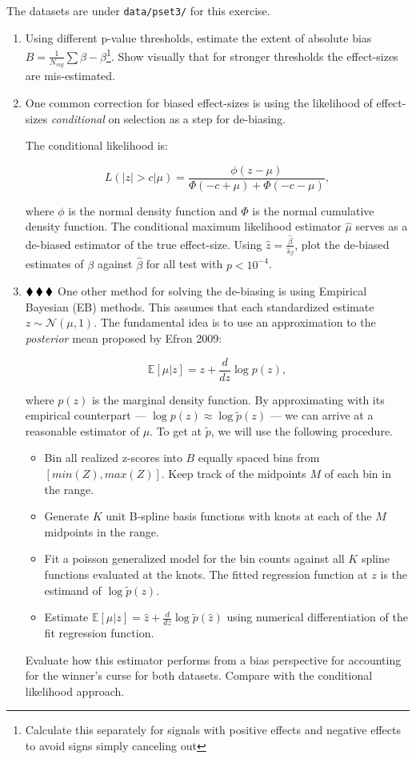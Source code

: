 \documentclass{pset}
\begin{document}
The datasets are under \texttt{data/pset3/} for this exercise.


\begin{enumerate}
\item Using different p-value thresholds, estimate the extent of absolute bias $B = \frac{1}{N_{sig}} \sum \hat{\beta} - \beta$\footnote{Calculate this separately for signals with positive effects and negative effects to avoid signs simply canceling out}. Show visually that for stronger thresholds the effect-sizes are mis-estimated. 
\item One common correction for biased effect-sizes is using the likelihood of effect-sizes \textit{conditional} on selection as a step for de-biasing.

The conditional likelihood is: 

$$L(|z| > c | \mu) = \frac{\phi(z - \mu)}{\Phi(-c + \mu) + \Phi(-c - \mu)},$$

where $\phi$ is the normal density function and $\Phi$ is the normal cumulative density function. The conditional maximum likelihood estimator $\hat{\mu}$ serves as a de-biased estimator of the true effect-size. Using $\hat{z}  = \frac{\hat{\beta}}{\hat{s}_\beta}$, plot the de-biased estimates of $\beta$ against $\hat{\beta}$ for all test with $p < 10^{-4}$. 

\item $\mathbin{\blacklozenge}\mathbin{\blacklozenge}\mathbin{\blacklozenge}$ One other method for solving the de-biasing is using Empirical Bayesian (EB) methods. This assumes that each standardized estimate $z \sim \mathcal{N}(\mu, 1)$. The fundamental idea is to use an approximation to the \textit{posterior} mean proposed by Efron 2009: 

$$\mathbb{E}[\mu | z] = z + \frac{d}{dz} \log p(z),$$

where $p(z)$ is the marginal density function. By approximating with its empirical counterpart --- $\log p(z) \approx \log \tilde{p}(z)$ --- we can arrive at a reasonable estimator of $\mu$. To get at $\tilde{p}$, we will use the following procedure. 

\begin{itemize}
	\item Bin all realized z-scores into $B$ equally spaced bins from $[min(Z), max(Z)]$. Keep track of the midpoints $M$ of each bin in the range.
	\item Generate $K$ unit B-spline basis functions with knots at each of the $M$ midpoints in the range.
	\item Fit a poisson generalized model for the bin counts against all $K$ spline functions evaluated at the knots. The fitted regression function at $z$ is the estimand of $\log \tilde{p}(z)$.
	\item Estimate $\mathbb{E}[\mu | z] = \hat{z} + \frac{d}{dz} \log \tilde{p}(\hat{z})$ using numerical differentiation of the fit regression function.    
\end{itemize}

Evaluate how this estimator performs from a bias perspective for accounting for the winner's curse for both datasets. Compare with the conditional likelihood approach.   

\end{enumerate}
\end{document}

